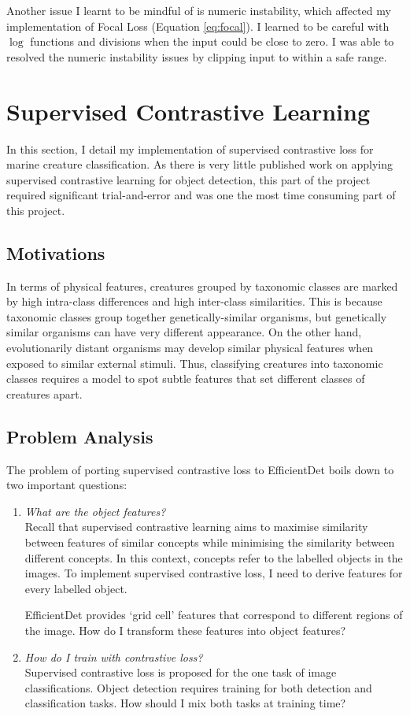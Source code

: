 \documentclass[12pt,a4paper,twoside,openany]{report}
\begin{document}
Another issue I learnt to be mindful of is numeric instability, which affected my implementation of Focal Loss (Equation \ref{eq:focal}). I learned to be careful with $\log$ functions and divisions when the input could be close to zero. I was able to resolved the numeric instability issues by clipping input to within a safe range.


\section{Supervised Contrastive Learning}
In this section, I detail my implementation of supervised contrastive loss \cite{khosla_supervised_2021} for marine creature classification. As there is very little published work on applying supervised contrastive learning for object detection, this part of the project required significant trial-and-error and was one the most time consuming part of this project.

\subsection{Motivations}
In terms of physical features, creatures grouped by taxonomic classes are marked by high intra-class differences and high inter-class similarities. This is because taxonomic classes group together genetically-similar organisms, but genetically similar organisms can have very different appearance. On the other hand, evolutionarily distant organisms may develop similar physical features when exposed to similar external stimuli. Thus, classifying creatures into taxonomic classes requires a model to spot subtle features that set different classes of creatures apart. 

\subsection{Problem Analysis}
The problem of porting supervised contrastive loss to EfficientDet boils down to two important questions:
\begin{enumerate}
    \item \textit{What are the object features?}\\ 
    Recall that supervised contrastive learning aims to maximise similarity between features of similar concepts while minimising the similarity between different concepts. In this context, concepts refer to the labelled objects in the images. To implement supervised contrastive loss, I need to derive features for every labelled object.

    EfficientDet provides `grid cell' features that correspond to different regions of the image. How do I transform these features into object features?
    \item \textit{How do I train with contrastive loss?}\\
    Supervised contrastive loss \cite{khosla_supervised_2021} is proposed for the one task of image classifications. Object detection requires training for both detection and classification tasks. How should I mix both tasks at training time?
\end{enumerate}
\end{document}
